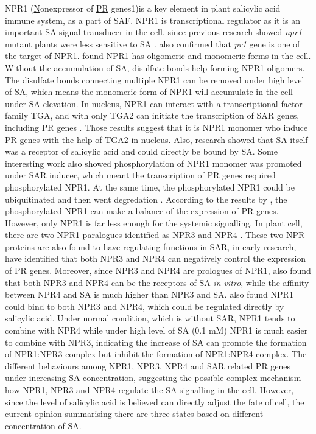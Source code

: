 NPR1 (\underline{N}onexpressor of \underline{PR} genes1)is a key element in plant salicylic acid immune system, as a part of SAF. NPR1 is transcriptional regulator as it is an important SA signal transducer in the cell, since previous research showed \textit{npr1} mutant plants were less sensitive to SA \citep{cao1997arabidopsis}. \citet{cao1997arabidopsis} also confirmed that \textit{pr1} gene is one of the target of NPR1. \citet{mou2003inducers} found NPR1 has oligomeric and monomeric forms in the cell. Without the accumulation of SA, disulfate bonds help forming NPR1 oligomers. The disulfate bonds connecting multiple NPR1 can be removed under high level of SA, which means the monomeric form of NPR1 will accumulate in the cell under SA elevation.  In nucleus, NPR1 can interact with a transcriptional factor family TGA, and with only TGA2 can initiate the transcription of SAR genes, including PR genes \citep{fan2002vivo}. Those results suggest that it is NPR1 monomer who induce PR genes with the help of TGA2 in nucleus. Also, research showed that SA itself was a receptor of salicylic acid and could directly be bound by SA\citep{wu2012arabidopsis}. Some interesting work also showed phosphorylation of NPR1 monomer was promoted under SAR inducer, which meant the transcription of PR genes required phosphorylated NPR1. At the same time, the phosphorylated NPR1 could be ubiquitinated and then went degredation \citep{spoel2009proteasome}. According to the results by \citet{spoel2009proteasome}, the phosphorylated NPR1 can make a balance of the expression of PR genes.\\ 
However, only NPR1 is far less enough for the systemic signalling. In plant cell, there are two NPR1 paralogues identified as NPR3 and NPR4 \citep{zhang2006negative}. These two NPR proteins are also found to have regulating functions in SAR, in early research, \citet{zhang2006negative} have identified that both NPR3 and NPR4 can negatively control the expression of PR genes. Moreover, since NPR3 and NPR4 are prologues of NPR1,  \citet{fu2012npr3} also found that both NPR3 and NPR4 can be the receptors of SA \textit{in vitro}, while the affinity between NPR4 and SA is much higher than NPR3 and SA. \citet{fu2012npr3} also found NPR1 could bind to both NPR3 and NPR4, which could be regulated directly by salicylic acid. Under normal condition, which is without SAR, NPR1 tends to combine with NPR4 while under high level of SA (0.1 mM) NPR1 is much easier to combine with NPR3, indicating the increase of SA can promote the formation of NPR1:NPR3 complex but inhibit the formation of NPR1:NPR4 complex. The different behaviours among NPR1, NPR3, NPR4 and SAR related PR genes under increasing SA concentration, suggesting the possible complex mechanism how NPR1, NPR3 and NPR4 regulate the SA signalling in the cell. However, since the level of salicylic acid is believed can directly adjust the fate of cell, the current opinion summarising there are three states based on different concentration of SA. \\
